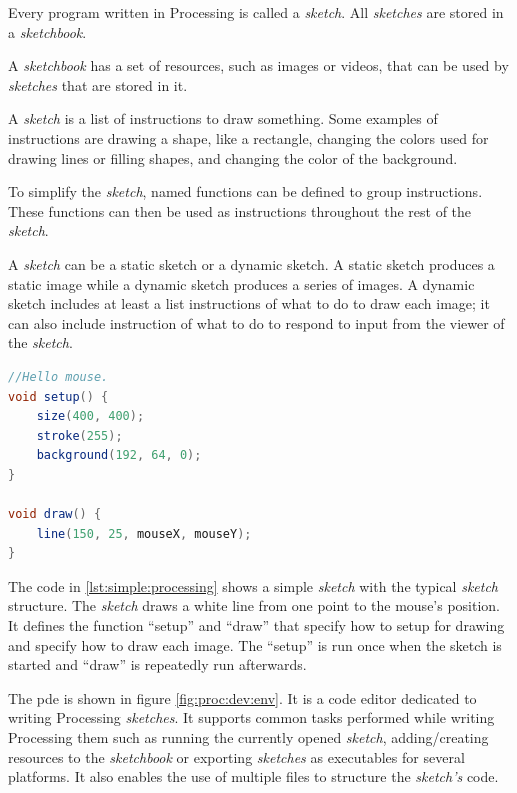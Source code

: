 \documentclass{./llncs2e/llncs}
\begin{document}
Every program written in Processing is called a \emph{sketch}. All \emph{sketches} are stored in a \emph{sketchbook}.

A \emph{sketchbook} has a set of resources, such as images or videos, that can be used by \emph{sketches} that are stored in it.

A \emph{sketch} is a list of instructions to draw something. Some examples of instructions are drawing a shape, like a rectangle, changing the colors used for drawing lines or filling shapes, and changing the color of the background.

To simplify the \emph{sketch}, named functions can be defined to group instructions. These functions can then be used as instructions throughout the rest of the \emph{sketch}.

A \emph{sketch} can be a static sketch or a dynamic sketch. A static sketch produces a static image while a dynamic sketch produces a series of images. A dynamic sketch includes at least a list instructions of what to do to draw each image; it can also include instruction of what to do to respond to input from the viewer of the \emph{sketch}.

\begin{lstlisting}[caption={A simple Processing sketch},label={lst:simple:processing},language=Java]
//Hello mouse.
void setup() {
    size(400, 400);
    stroke(255);
    background(192, 64, 0);
}
 
void draw() {
    line(150, 25, mouseX, mouseY);
}
\end{lstlisting}

The code in \ref{lst:simple:processing} shows a simple \emph{sketch} with the typical \emph{sketch} structure. The \emph{sketch} draws a white line from one point to the mouse's position. It defines the function ``setup'' and  ``draw'' that specify how to setup for drawing and specify how to draw each image. The ``setup'' is run once when the sketch is started and ``draw'' is repeatedly run afterwards.

The \ac{pde} is shown in figure \ref{fig:proc:dev:env}. It is a code editor dedicated to writing Processing \emph{sketches}. It supports common tasks performed while writing Processing them such as running the currently opened \emph{sketch}, adding/creating resources to the \emph{sketchbook} or exporting \emph{sketches} as executables for several platforms. It also enables the use of multiple files to structure the \emph{sketch's} code.
\end{document}
